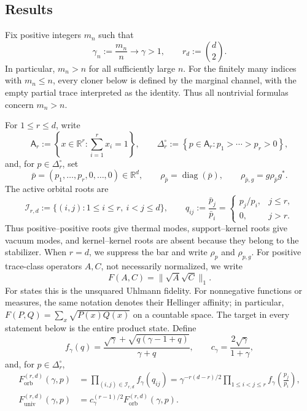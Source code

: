 \documentclass[11pt]{article}
\theoremstyle{remark}
\theoremstyle{plain}
\newcommand{\R}{\mathbb R}
\newcommand{\diag}{\operatorname{diag}}
\newcommand{\Forb}{F_{\mathrm{orb}}}
\newcommand{\Funiv}{F_{\mathrm{univ}}}
\begin{document}
\subsection{Results}\label{sec:main-results}

Fix positive integers \(m_n\) such that
\[
  \gamma_n:=\frac{m_n}{n}\longrightarrow\gamma>1,
  \qquad r_d:=\binom d2.
\]
In particular, \(m_n>n\) for all sufficiently large \(n\).  For the
finitely many indices with \(m_n\le n\), every cloner below is defined by
the marginal channel, with the empty partial trace interpreted as the
identity.  Thus all nontrivial formulas concern \(m_n>n\).

For \(1\le r\le d\), write
\[
  \mathsf A_r:=\left\{x\in\R^r:\sum_{i=1}^r x_i=1\right\},
  \qquad
  \Delta_r^\circ
  :=\left\{p\in\mathsf A_r:p_1>\cdots>p_r>0\right\},
\]
and, for \(p\in\Delta_r^\circ\), set
\[
  \bar p=(p_1,\ldots,p_r,0,\ldots,0)\in\R^d,
  \qquad
  \rho_{\bar p}=\diag(\bar p),
  \qquad
  \rho_{\bar p,g}=g\rho_{\bar p}g^*.
\]
The active orbital roots are
\begin{equation}\label{eq:active-root-set-main}
  \mathcal I_{r,d}
  :=\{(i,j):1\le i\le r,\ i<j\le d\},
  \qquad
  q_{ij}:=\frac{\bar p_j}{\bar p_i}
  =\begin{cases}
      p_j/p_i,&j\le r,\\
      0,&j>r.
    \end{cases}
\end{equation}
Thus positive--positive roots give thermal modes, support--kernel roots give
vacuum modes, and kernel--kernel roots are absent because they belong to the
stabilizer.
When \(r=d\), we suppress the bar and write \(\rho_p\) and
\(\rho_{p,g}\).
For positive trace-class operators \(A,C\), not necessarily normalized, we
write
\[
  F(A,C)=\|\sqrt A\sqrt C\|_1.
\]
For states this is the unsquared Uhlmann fidelity.  For nonnegative functions
or measures, the same notation denotes their Hellinger affinity; in
particular, \(F(P,Q)=\sum_x\sqrt{P(x)Q(x)}\) on a countable space.  The target
in every statement below is the entire product state.  Define
\[
  f_\gamma(q)
  =\frac{\sqrt\gamma+\sqrt{q(\gamma-1+q)}}{\gamma+q},
  \qquad
  c_\gamma=\frac{2\sqrt\gamma}{1+\gamma},
\]
and, for \(p\in\Delta_r^\circ\),
\begin{align}
  \Forb^{(r,d)}(\gamma,p)
  &=\prod_{(i,j)\in\mathcal I_{r,d}}f_\gamma(q_{ij})
   =\gamma^{-r(d-r)/2}
    \prod_{1\le i<j\le r}f_\gamma\!\left(\frac{p_j}{p_i}\right),
  \label{eq:rank-orb-value}\\
  \Funiv^{(r,d)}(\gamma,p)
  &=c_\gamma^{(r-1)/2}\Forb^{(r,d)}(\gamma,p).
  \label{eq:rank-univ-value}
\end{align}
\end{document}
